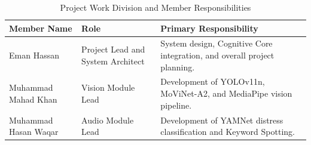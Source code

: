 \begin{table}[H]
    \centering
    \caption{Project Work Division and Member Responsibilities}
    \label{tab:work_division}
    \renewcommand{\arraystretch}{1.5}
    \begin{tabular}{|p{4cm}|p{4cm}|p{5.5cm}|}
    \hline
    \textbf{Member Name} & \textbf{Role} & \textbf{Primary Responsibility} \\ \hline
    Eman Hassan &
    Project Lead and System Architect &
    System design, Cognitive Core integration, and overall project planning. \\ \hline
    Muhammad Mahad Khan &
    Vision Module Lead &
    Development of YOLOv11n, MoViNet-A2, and MediaPipe vision pipeline. \\ \hline
    Muhammad Hasan Waqar &
    Audio Module Lead &
    Development of YAMNet distress classification and Keyword Spotting. \\ \hline
    \end{tabular}
\end{table}
